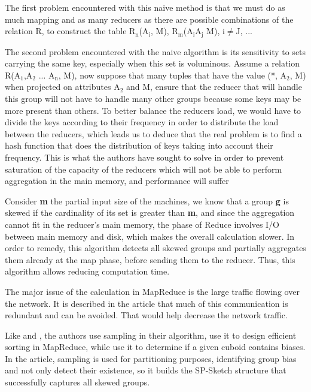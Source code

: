 \documentclass[10pt,journal,compsoc]{IEEEtran}
\begin{document}
The first problem encountered with this naive method is that we must do as much mapping and as many reducers as there are possible combinations of the relation R, to construct the table $\textrm{R}_\textrm{n}$($\textrm{A}_\textrm{i}$, M), $\textrm{R}_\textrm{m}$($\textrm{A}_\textrm{i}$$\textrm{A}_\textrm{j}$ M), i$\ne$J, ...

The second problem encountered with the naive algorithm is its sensitivity to sets carrying the same key, especially when this set is voluminous. Assume a relation R($\textrm{A}_\textrm{1}$,$\textrm{A}_\textrm{2}$ ... $\textrm{A}_\textrm{n}$, M), now suppose that many tuples that have the value (*, $\textrm{A}_\textrm{2}$, M) when projected on attributes $\textrm{A}_\textrm{2}$ and M, ensure that the reducer that will handle this group will not have to handle many other groups because some keys may be more present than others. To better balance the reducers load, we would have to divide the keys according to their frequency in order to distribute the load between the reducers, which leads us to deduce that the real problem is to find a hash function that does the distribution of keys taking into account their frequency. This is what the authors have sought to solve in order to prevent saturation of the capacity of the reducers which will not be able to perform aggregation in the main memory, and performance will suffer

Consider \textbf{m} the partial input size of the machines, we know that a group \textbf{g} is skewed if the cardinality of its set is greater than \textbf{m}, and since the aggregation cannot fit in the reducer's main memory, the phase of Reduce involves I/O between main memory and disk, which makes the overall calculation slower. In order to remedy, this algorithm detects all skewed groups and partially aggregates them already at the map phase, before sending them to the reducer. Thus, this algorithm allows reducing computation time.

The major issue of the calculation in MapReduce is the large traffic flowing over the network. It is described in the article that much of this communication is redundant and can be avoided. That would help decrease the network traffic.

Like \cite{32} and \cite{26}, the authors use sampling in their algorithm, \cite{32} use it to design efficient sorting in MapReduce, while  \cite{26} use it to determine if a given cuboid contains biases. In the article, sampling is used for partitioning purposes, identifying group bias and not only detect their existence, so it builds the SP-Sketch structure that successfully captures all skewed groups.
\end{document}
